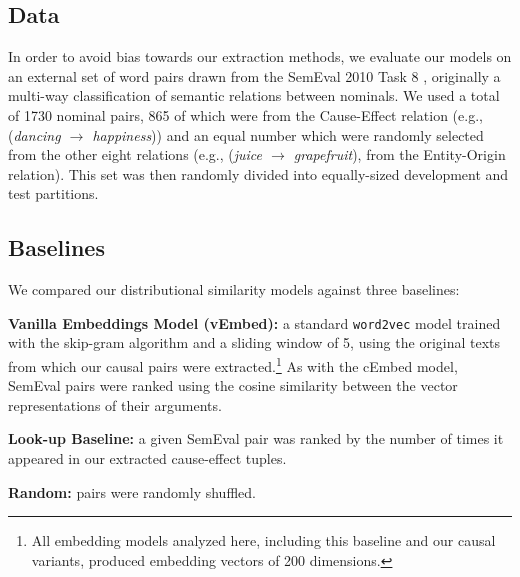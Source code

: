 \subsection{Data}
In order to avoid bias towards our extraction methods, we evaluate our models on an external set of word pairs drawn from the SemEval 2010 Task 8 \cite{hendrickx2009semeval}, originally a multi-way classification of semantic relations between nominals.  We used a total of 1730 nominal pairs, 865 of which were from the Cause-Effect relation (e.g., (\emph{dancing $\rightarrow$ happiness})) and an equal number which were randomly selected from the other eight relations (e.g., (\emph{juice $\rightarrow$ grapefruit}), from the Entity-Origin relation).  This set was then randomly divided into equally-sized development and test partitions.

\subsection{Baselines}
We compared our distributional similarity models against three baselines:

{\flushleft \textbf{Vanilla Embeddings Model (vEmbed):}} a standard \texttt{word2vec} model trained with the skip-gram algorithm and a sliding window of 5, using the original texts from which our causal pairs were extracted.\footnote{All embedding models analyzed here, including this baseline and our causal variants, produced embedding vectors of 200 dimensions.} As with the cEmbed model, SemEval pairs were ranked using the cosine similarity between the vector representations of their arguments.
\vspace{-1mm}

{\flushleft \textbf{Look-up Baseline:}} a given SemEval pair was ranked by the number of times it appeared in our extracted cause-effect tuples. 
\vspace{-1mm}

{\flushleft \textbf{Random:}} pairs were randomly shuffled.
\vspace{-1mm}



